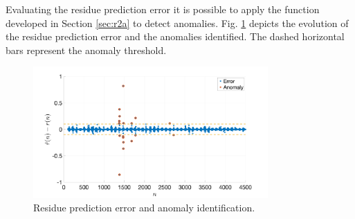 \documentclass[a4paper, oneside, 11pt]{article}
\begin{document}
Evaluating the residue prediction error it is possible to apply the function developed in Section \ref{sec:r2a} to detect anomalies. Fig. \ref{fig:R2b_error_an} depicts the evolution of the residue prediction error and the anomalies identified. The dashed horizontal bars represent the anomaly threshold. 
\begin{figure}[htbp]
	\centering
	\includegraphics[width= 0.8\textwidth]{figures/R2b_error_an.png}
	\caption{Residue prediction error and anomaly identification.}
	\label{fig:R2b_error_an}
\end{figure}
\end{document}
